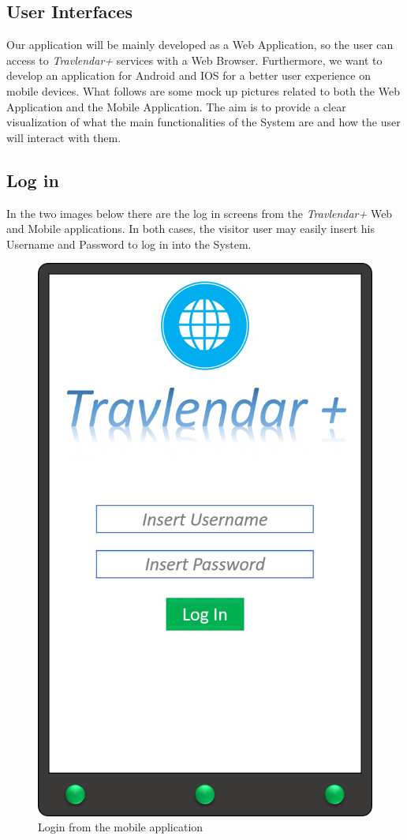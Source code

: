 \subsection{User Interfaces}
Our application will be mainly developed as a Web Application, so the user can access to \emph{Travlendar+} services with a Web Browser. Furthermore, we want to develop an application for Android and IOS for a better user experience on mobile devices. What follows are some mock up pictures related to both the Web Application and the Mobile Application. The aim is to provide a clear visualization of what the main functionalities of the System are and how the user will interact with them.   
\newpage
\subsection*{Log in}
In the two images below there are the log in screens from the \emph{Travlendar+} Web and Mobile applications. In both cases, the visitor user may easily insert his Username and Password to log in into the System.  

\begin{figure}[H]
    \centering
    \includegraphics[scale=0.25]{Pictures/Mockups/AppLogin.png}
    \caption{Login from the mobile application}
\end{figure}

